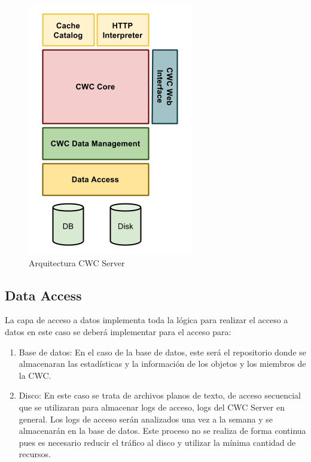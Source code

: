 \begin{figure}[h]
  \centering
    \includegraphics[scale=0.75]{gfx/ArquitecturaCWCServer}
  \caption{Arquitectura CWC Server}
  \label{ArquitecturaCWCServer}
\end{figure}


\subsection{Data Access}

La capa de acceso a datos implementa toda la lógica para realizar el acceso a datos en este caso se deberá implementar para el acceso para:

\begin{enumerate}
\item Base de datos: En el caso de la base de datos, este será el repositorio donde se almacenaran las estadísticas y la información de los objetos y los miembros de la CWC.
\item Disco: En este caso se trata de archivos planos de texto, de acceso secuencial que se utilizaran para almacenar logs de acceso, logs del CWC Server en general. Los logs de acceso serán analizados una vez a la semana y se almacenarán en la base de datos. Este proceso no se realiza de forma continua pues es necesario reducir el tráfico al disco y utilizar la mínima cantidad de recursos.
\end{enumerate}

